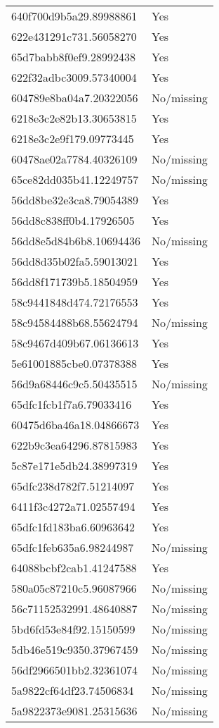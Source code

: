 \begin{tabular}{ll}
640f700d9b5a29.89988861 & Yes \\
622e431291c731.56058270 & Yes \\
65d7babb8f0ef9.28992438 & Yes \\
622f32adbc3009.57340004 & Yes \\
604789e8ba04a7.20322056 & No/missing \\
6218e3c2e82b13.30653815 & Yes \\
6218e3c2e9f179.09773445 & Yes \\
60478ae02a7784.40326109 & No/missing \\
65ce82dd035b41.12249757 & No/missing \\
56dd8be32e3ca8.79054389 & Yes \\
56dd8c838ff0b4.17926505 & Yes \\
56dd8e5d84b6b8.10694436 & No/missing \\
56dd8d35b02fa5.59013021 & Yes \\
56dd8f171739b5.18504959 & Yes \\
58c9441848d474.72176553 & Yes \\
58c94584488b68.55624794 & No/missing \\
58c9467d409b67.06136613 & Yes \\
5e61001885cbe0.07378388 & Yes \\
56d9a68446c9c5.50435515 & No/missing \\
65dfc1fcb1f7a6.79033416 & Yes \\
60475d6ba46a18.04866673 & Yes \\
622b9c3ea64296.87815983 & Yes \\
5c87e171e5db24.38997319 & Yes \\
65dfc238d782f7.51214097 & Yes \\
6411f3c4272a71.02557494 & Yes \\
65dfc1fd183ba6.60963642 & Yes \\
65dfc1feb635a6.98244987 & No/missing \\
64088bcbf2cab1.41247588 & Yes \\
580a05c87210c5.96087966 & No/missing \\
56c71152532991.48640887 & No/missing \\
5bd6fd53e84f92.15150599 & No/missing \\
5db46e519c9350.37967459 & No/missing \\
56df2966501bb2.32361074 & No/missing \\
5a9822cf64df23.74506834 & No/missing \\
5a9822373e9081.25315636 & No/missing \\

\end{tabular}
